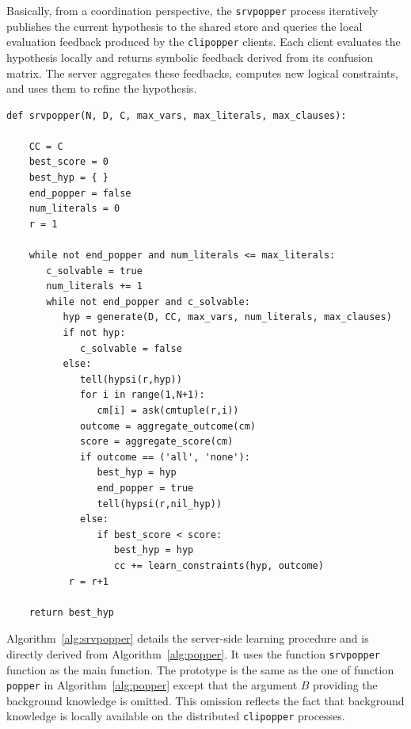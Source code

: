 Basically, from a coordination perspective, the \texttt{srvpopper} process iteratively publishes the current hypothesis to the shared store and queries the local evaluation feedback produced by the \texttt{clipopper} clients. Each client evaluates the hypothesis locally and returns symbolic feedback derived from its confusion matrix. The server aggregates these feedbacks, computes new logical constraints, and uses them to refine the hypothesis. 

\begin{algorithm}[t]
  \caption{Srvpopper client}
  \label{alg:srvpopper}
  \small
  \begin{lstlisting}
def srvpopper(N, D, C, max_vars, max_literals, max_clauses):

    CC = C
    best_score = 0
    best_hyp = { }
    end_popper = false
    num_literals = 0
    r = 1

    while not end_popper and num_literals <= max_literals:
       c_solvable = true
       num_literals += 1
       while not end_popper and c_solvable:
          hyp = generate(D, CC, max_vars, num_literals, max_clauses)
          if not hyp:
             c_solvable = false
          else:
             tell(hypsi(r,hyp))
             for i in range(1,N+1):
                cm[i] = ask(cmtuple(r,i))
             outcome = aggregate_outcome(cm)
             score = aggregate_score(cm)
             if outcome == ('all', 'none'):
                best_hyp = hyp
                end_popper = true
                tell(hypsi(r,nil_hyp))                
             else:
                if best_score < score:
                   best_hyp = hyp
                   cc += learn_constraints(hyp, outcome)
           r = r+1
                   
    return best_hyp
  \end{lstlisting}
\end{algorithm}



Algorithm~\ref{alg:srvpopper} details the server-side learning procedure and is directly derived from Algorithm~\ref{alg:popper}.
It uses the function \texttt{srvpopper} function as the main function. The prototype is the same as the one of function \texttt{popper} in Algorithm~\ref{alg:popper} except that the argument $B$ providing the background knowledge is omitted. %
This omission reflects the fact that background knowledge is locally available on the distributed \texttt{clipopper} processes.


